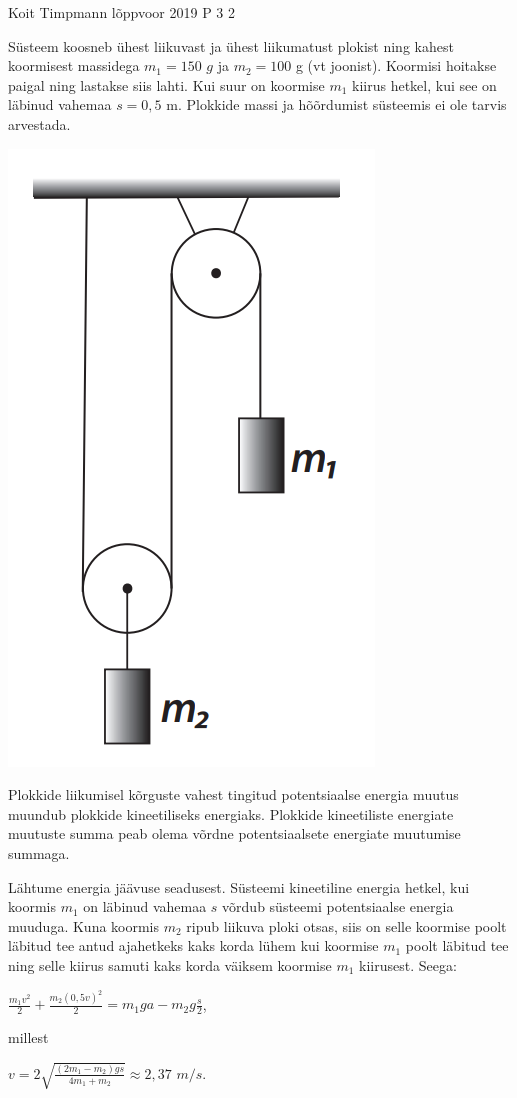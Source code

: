 {Koit Timpmann} %
{lõppvoor} %
{2019} %
{P 3} %
{2} %
{
\ifStatement
Süsteem koosneb ühest liikuvast ja ühest liikumatust plokist ning kahest koormisest massidega $m_1 = 150$ $g$ ja $m_2 = 100$ g (vt joonist). Koormisi hoitakse paigal ning lastakse siis lahti. Kui suur on koormise $m_1$ kiirus hetkel, kui see on läbinud vahemaa $s = 0,5$ m. Plokkide massi ja hõõrdumist süsteemis ei ole tarvis arvestada.
\begin{center}
	\includegraphics[width=0.5\linewidth]{2019-v3p-03-yl.PNG}
\end{center}
\fi

\ifHint
Plokkide liikumisel kõrguste vahest tingitud potentsiaalse energia muutus muundub plokkide kineetiliseks energiaks. Plokkide kineetiliste energiate muutuste summa peab olema võrdne potentsiaalsete energiate muutumise summaga.
\fi

\ifSolution
Lähtume energia jäävuse seadusest. Süsteemi kineetiline energia hetkel, kui koormis $m_1$ on läbinud vahemaa $s$ võrdub süsteemi potentsiaalse energia muuduga. Kuna koormis $m_2$ ripub liikuva ploki otsas, siis on selle koormise poolt läbitud tee antud ajahetkeks kaks korda lühem kui koormise $m_1$ poolt läbitud tee ning selle kiirus samuti kaks korda väiksem koormise $m_1$ kiirusest.
Seega: 
\begin{center}
$\frac{m_1 v^2}{2} + \frac{m_2(0,5v)^2}{2} = m_1ga - m_2g\frac{s}{2}$,
\end{center}
millest
\begin{center}
$v = 2\sqrt{\frac{(2m_1 - m_2)gs}{4m_1 + m_2}} \approx 2,37$ $m/s$.
\end{center}
\fi
}